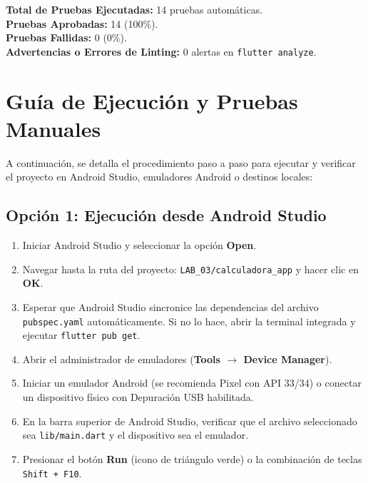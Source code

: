 \documentclass[12pt,a4paper]{article}
\begin{document}
\begin{tcolorbox}[colback=calloutbg,colframe=codegreen,title=\textbf{Resultado de la Validación}]
\textbf{Total de Pruebas Ejecutadas:} 14 pruebas automáticas.\\
\textbf{Pruebas Aprobadas:} 14 (100\%).\\
\textbf{Pruebas Fallidas:} 0 (0\%).\\
\textbf{Advertencias o Errores de Linting:} 0 alertas en \texttt{flutter analyze}.
\end{tcolorbox}

\section{Guía de Ejecución y Pruebas Manuales}

A continuación, se detalla el procedimiento paso a paso para ejecutar y verificar el proyecto en Android Studio, emuladores Android o destinos locales:

\subsection{Opción 1: Ejecución desde Android Studio}
\begin{enumerate}
    \item Iniciar Android Studio y seleccionar la opción \textbf{Open}.
    \item Navegar hasta la ruta del proyecto: \texttt{LAB\_03/calculadora\_app} y hacer clic en \textbf{OK}.
    \item Esperar que Android Studio sincronice las dependencias del archivo \texttt{pubspec.yaml} automáticamente. Si no lo hace, abrir la terminal integrada y ejecutar \texttt{flutter pub get}.
    \item Abrir el administrador de emuladores (\textbf{Tools $\rightarrow$ Device Manager}).
    \item Iniciar un emulador Android (se recomienda Pixel con API 33/34) o conectar un dispositivo físico con Depuración USB habilitada.
    \item En la barra superior de Android Studio, verificar que el archivo seleccionado sea \texttt{lib/main.dart} y el dispositivo sea el emulador.
    \item Presionar el botón \textbf{Run} (icono de triángulo verde) o la combinación de teclas \texttt{Shift + F10}.
\end{enumerate}
\end{document}

